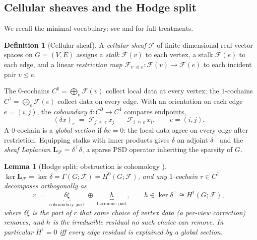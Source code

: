 \documentclass{article}
\newcommand{\sheaf}{\mathcal{F}}
\newcommand{\Cochain}{C}
\newcommand{\Lap}{\mathbf{L}}
\newcommand{\coboundary}{\delta}
\newcommand{\restr}[2]{\sheaf_{#1 \,\trianglelefteq\, #2}}
\newcommand{\Sections}{\Gamma}
\newcommand{\Hcoh}{H}
\theoremstyle{definition}
\newtheorem{definition}{Definition}
\theoremstyle{plain}
\newtheorem{lemma}{Lemma}
\theoremstyle{remark}
\begin{document}
\subsection{Cellular sheaves and the Hodge split}
\label{sec:prelim-sheaves}

We recall the minimal vocabulary; see \citet{curry2014sheaves} and
\citet{hansen2019toward} for full treatments.

\begin{definition}[Cellular sheaf]
A \emph{cellular sheaf} $\sheaf$ of finite-dimensional real vector spaces
on $G=(V,E)$ assigns a \emph{stalk} $\sheaf(v)$ to each vertex, a stalk
$\sheaf(e)$ to each edge, and a linear \emph{restriction map}
$\restr{v}{e}:\sheaf(v)\to\sheaf(e)$ to each incident pair
$v\trianglelefteq e$.
\end{definition}

The $0$-cochains $\Cochain^0=\bigoplus_v\sheaf(v)$ collect local data at
every vertex; the $1$-cochains $\Cochain^1=\bigoplus_e\sheaf(e)$ collect
data on every edge. With an orientation on each edge $e=(i,j)$, the
\emph{coboundary} $\coboundary:\Cochain^0\to\Cochain^1$ compares endpoints,
\begin{equation}
  (\coboundary x)_e \;=\; \restr{j}{e}\,x_j \;-\; \restr{i}{e}\,x_i,
  \qquad e=(i,j).
  \label{eq:coboundary}
\end{equation}
A $0$-cochain is a \emph{global section} if $\coboundary x=0$: the local
data agree on every edge after restriction. Equipping stalks with inner
products gives $\coboundary$ an adjoint $\coboundary^{\!\top}$ and the
\emph{sheaf Laplacian}
$\Lap_{\sheaf}=\coboundary^{\!\top}\coboundary$, a sparse PSD operator
inheriting the sparsity of $G$.

\begin{lemma}[Hodge split; obstruction is cohomology
{\citep{hansen2019toward}}]
\label{lem:hodge}
$\ker\Lap_{\sheaf}=\ker\coboundary=\Sections(G;\sheaf)=\Hcoh^0(G;\sheaf)$,
and any $1$-cochain $r\in\Cochain^1$ decomposes orthogonally as
\[
  r \;=\; \underbrace{\coboundary\xi}_{\text{coboundary part}}
        \;\oplus\;
        \underbrace{h}_{\text{harmonic part}},
  \qquad
  h\in\ker\coboundary^{\!\top}\cong\Hcoh^1(G;\sheaf),
\]
where $\coboundary\xi$ is the part of $r$ that some choice of vertex data
(a per-view correction) removes, and $h$ is the irreducible residual no
such choice can remove. In particular $\Hcoh^1=0$ iff every edge residual
is explained by a global section.
\end{lemma}
\end{document}
